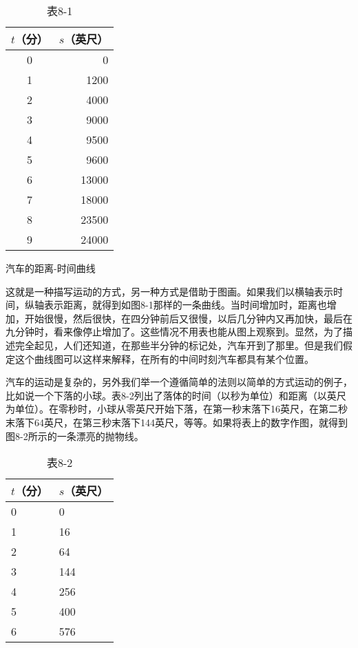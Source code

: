 \documentclass[12pt,oneside]{book}
\begin{document}
\begin{table}[H]
\centering
\caption{表8-1}
\label{tab:表8-1}
\medskip 
\begin{tabular}{@{}cr@{}}
\toprule
$t$（分） & $s$（英尺）  \\ \midrule
0 & 0     \\
1 & 1200  \\
2 & 4000  \\
3 & 9000  \\
4 & 9500  \\
5 & 9600  \\
6 & 13000 \\
7 & 18000 \\
8 & 23500 \\
9 & 24000 
\\ \bottomrule
\end{tabular}
\end{table}


\begin{fig}{汽车的距离-时间曲线}
\caption{汽车的距离-时间曲线}
\label{fig:汽车的距离-时间曲线}
\end{fig}


这就是一种描写运动的方式，另一种方式是借助于图画。如果我们以横轴表示时间，纵轴表示距离，就得到如图8-1那样的一条曲线。当时间增加时，距离也增加，开始很慢，然后很快，在四分钟前后又很慢，以后几分钟内又再加快，最后在九分钟时，看来像停止增加了。这些情况不用表也能从图上观察到。显然，为了描述完全起见，人们还知道，在那些半分钟的标记处，汽车开到了那里。但是我们假定这个曲线图可以这样来解释，在所有的中间时刻汽车都具有某个位置。


汽车的运动是复杂的，另外我们举一个遵循简单的法则以简单的方式运动的例子，比如说一个下落的小球。表8-2列出了落体的时间（以秒为单位）和距离（以英尺为单位）。在零秒时，小球从零英尺开始下落，在第一秒末落下16英尺，在第二秒末落下64英尺，在第三秒末落下144英尺，等等。如果将表上的数字作图，就得到图8-2所示的一条漂亮的抛物线。


\begin{table}[H]
\centering
\caption{表8-2}
\label{tab:表8-2}
\medskip 
\begin{tabular}{@{}ll@{}}
\toprule
$t$（分） & $s$（英尺）  \\ \midrule
0 & 0     \\
1 & 16  \\
2 & 64  \\
3 & 144  \\
4 & 256  \\
5 & 400  \\
6 & 576 
\\ \bottomrule
\end{tabular}
\end{table}
\end{document}
